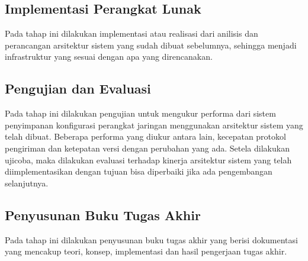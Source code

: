  		\subsection{Implementasi Perangkat Lunak}
 			Pada tahap ini dilakukan implementasi atau realisasi dari anilisis dan perancangan arsitektur sistem yang sudah dibuat sebelumnya, sehingga menjadi infrastruktur yang sesuai dengan apa yang direncanakan.
 		\subsection{Pengujian dan Evaluasi}
 			Pada tahap ini dilakukan pengujian untuk mengukur performa dari sistem penyimpanan konfigurasi perangkat jaringan menggunakan arsitektur sistem yang telah dibuat. Beberapa performa yang diukur antara lain, kecepatan protokol pengiriman dan ketepatan versi dengan perubahan yang ada. Setela dilakukan ujicoba, maka dilakukan evaluasi terhadap kinerja arsitektur sistem yang telah diimplementasikan dengan tujuan bisa diperbaiki jika ada pengembangan selanjutnya.
 		\subsection{Penyusunan Buku Tugas Akhir}
 			Pada tahap ini dilakukan penyusunan buku tugas akhir yang berisi dokumentasi yang mencakup teori, konsep, implementasi dan hasil pengerjaan tugas akhir.
 			

